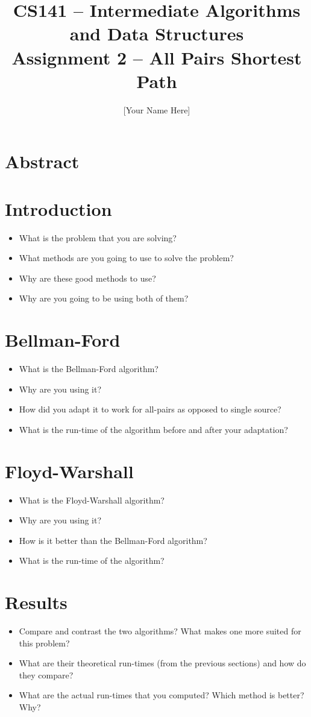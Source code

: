 \documentclass[twocolumn]{article}
\title{CS141 -- Intermediate Algorithms and Data Structures\\Assignment 2 -- All
Pairs Shortest Path}
\author{[Your Name Here]}
\date{}
\begin{document}
\maketitle

\section*{Abstract}
\textbf{\small}

\section{Introduction}
\begin{itemize}
    \item What is the problem that you are solving?
    \item What methods are you going to use to solve the problem?
    \item Why are these good methods to use?
    \item Why are you going to be using both of them?
\end{itemize}

\section{Bellman-Ford}
\begin{itemize}
    \item What is the Bellman-Ford algorithm?
    \item Why are you using it?
    \item How did you adapt it to work for all-pairs as opposed to single
    source?
    \item What is the run-time of the algorithm before and after your
    adaptation?
\end{itemize}

\section{Floyd-Warshall}
\begin{itemize}
    \item What is the Floyd-Warshall algorithm?
    \item Why are you using it?
    \item How is it better than the Bellman-Ford algorithm?
    \item What is the run-time of the algorithm?
\end{itemize}

\section{Results}
\begin{itemize}
    \item Compare and contrast the two algorithms? What makes one more suited
    for this problem?
    \item What are their theoretical run-times (from the previous sections) and
    how do they compare?
    \item What are the actual run-times that you computed? Which method is
    better? Why?
\end{itemize}
\end{document}
